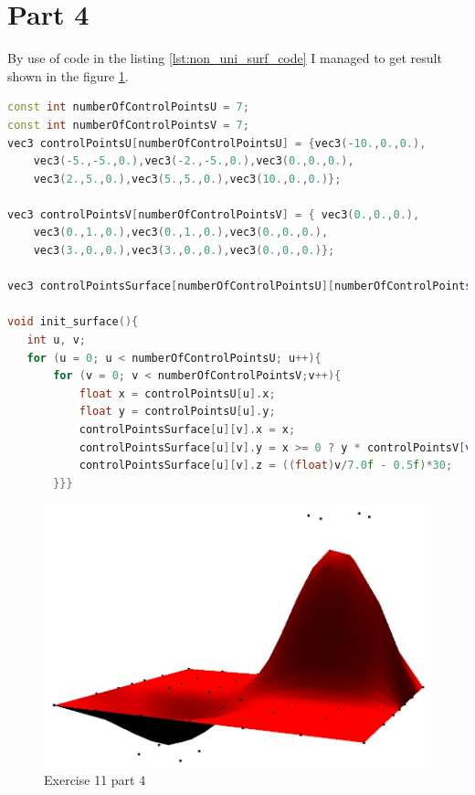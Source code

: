 \section{Part 4}
By use of code in the listing \ref{lst:non_uni_surf_code} I managed to get result shown in the figure \ref{fig:exercise_11_part_4}.
\begin{lstlisting}[language=cpp, caption={3D non uniform b-spline surface}, label={lst:non_uni_surf_code}]
const int numberOfControlPointsU = 7;
const int numberOfControlPointsV = 7;
vec3 controlPointsU[numberOfControlPointsU] = {vec3(-10.,0.,0.),
	vec3(-5.,-5.,0.),vec3(-2.,-5.,0.),vec3(0.,0.,0.),
	vec3(2.,5.,0.),vec3(5.,5.,0.),vec3(10.,0.,0.)};

vec3 controlPointsV[numberOfControlPointsV] = { vec3(0.,0.,0.),
	vec3(0.,1.,0.),vec3(0.,1.,0.),vec3(0.,0.,0.),
	vec3(3.,0.,0.),vec3(3.,0.,0.),vec3(0.,0.,0.)};
	
vec3 controlPointsSurface[numberOfControlPointsU][numberOfControlPointsV];

void init_surface(){
   int u, v;
   for (u = 0; u < numberOfControlPointsU; u++){
	   for (v = 0; v < numberOfControlPointsV;v++){
		   float x = controlPointsU[u].x;
		   float y = controlPointsU[u].y;
		   controlPointsSurface[u][v].x = x;
		   controlPointsSurface[u][v].y = x >= 0 ? y * controlPointsV[v].x : y * controlPointsV[v].y;
		   controlPointsSurface[u][v].z = ((float)v/7.0f - 0.5f)*30;
	   }}}  
\end{lstlisting}
\begin{figure}[ht!]
	\begin{center}
		\includegraphics[width=1.0\textwidth]{figures/exercise_11_part_4}
	\end{center}
	\vspace{-4.5ex}\caption{Exercise 11 part 4}
	\label{fig:exercise_11_part_4} 
\end{figure}
